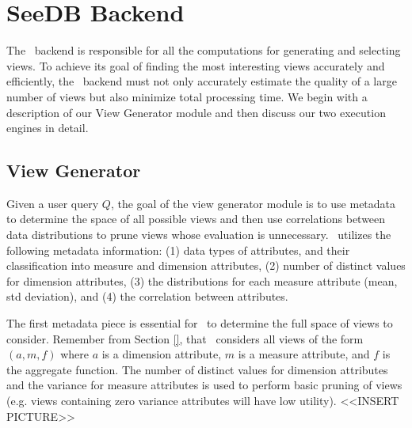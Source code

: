 
\section{SeeDB Backend}
\label{subsec:seedb_backend}

The \SeeDB\ backend is responsible for all the computations for 
generating and selecting views. 
To achieve its goal of finding the most
interesting views accurately and efficiently, the \SeeDB\ backend must not only accurately
estimate the quality of a large number of views but also minimize total processing time.
We begin with a description of our View Generator module and then discuss our
two execution engines in detail. 

\subsection{View Generator}
\label{subsec:view_generator}
Given a user query $Q$, the goal of the view generator module is to use metadata
to determine the space of all possible views and then use correlations between
data distributions to prune views whose evaluation is unnecessary. \SeeDB\
utilizes the following metadata information: (1) data types of attributes, and
their classification into measure and dimension attributes, (2) number of
distinct values for dimension attributes, (3) the
distributions for each measure attribute (mean, std deviation), and (4) the
correlation between attributes.

The first metadata piece is essential for \SeeDB\ to determine the full space of
views to consider. 
Remember from Section \ref{}, that \SeeDB\ considers all
views of the form $(a, m, f)$ where $a$ is a dimension attribute, $m$ is a
measure attribute, and $f$ is the aggregate function. 
The number of distinct values for dimension attributes and the variance for
measure attributes is used to perform basic pruning of views (e.g. views
containing zero variance attributes will have low utility).
<<INSERT PICTURE>>


